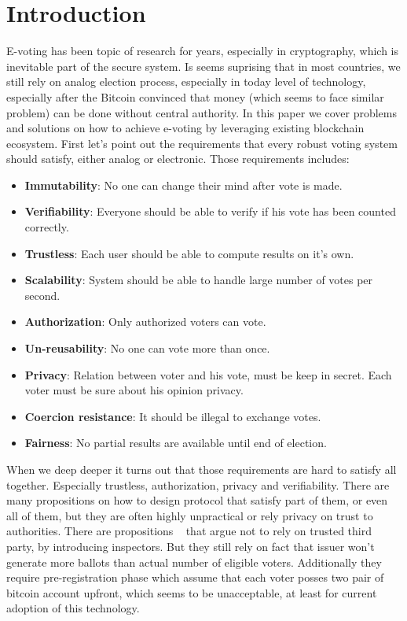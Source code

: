 \documentclass[runningheads]{llncs}
\begin{document}
\section{Introduction}
E-voting has been topic of research for years, especially in cryptography, which is inevitable part of the secure system. Is seems suprising that in most countries, we still rely on analog election process, especially in today level of technology, especially after the Bitcoin convinced that money (which seems to face similar problem) can be done without central authority. In this paper we cover problems and solutions on how to achieve e-voting by leveraging existing blockchain ecosystem. 
First let's point out the requirements that every robust voting system should satisfy, either analog or electronic. Those requirements includes:
\begin{itemize}
\item \textbf{Immutability}: No one can change their mind after vote is made.
\item \textbf{Verifiability}: Everyone should be able to verify if his vote has been counted correctly.
\item \textbf{Trustless}: Each user should be able to compute results on it's own.
\item \textbf{Scalability}: System should be able to handle large number of votes per second.
\item \textbf{Authorization}: Only authorized voters can vote.
\item \textbf{Un-reusability}: No one can vote more than once.
\item \textbf{Privacy}: Relation between voter and his vote, must be keep in secret. Each voter must be sure about his opinion privacy. 
\item \textbf{Coercion resistance}: It should be illegal to exchange votes.
\item \textbf{Fairness}: No partial results are available until end of election.
\end{itemize}

When we deep deeper it turns out that those requirements are hard to satisfy all together. Especially trustless, authorization, privacy and verifiability. There are many propositions on how to design protocol that satisfy part of them, or even all of them, but they are often highly unpractical or rely privacy on trust to authorities. There are propositions ~\cite{liu2017voting} that argue not to rely on trusted third party, by introducing inspectors. But they still rely on fact that issuer won't generate more ballots than actual number of eligible voters. Additionally they require pre-registration phase which assume that each voter posses two pair of bitcoin account upfront, which seems to be unacceptable, at least for current adoption of this technology.
\end{document}
